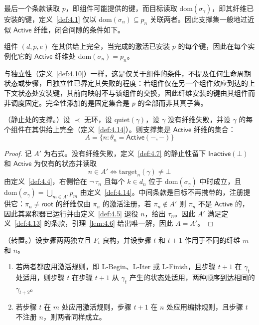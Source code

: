 最后一个条款读取 $p$，即组件可能提供的键，而目标读取 $\mathrm{dom}(\sigma_\gamma)$，即其纤维已安装的键，定义~\ref{def:4.1} 仅以 $\mathrm{dom}(\sigma_n) \subseteq p_n$ 关联两者。因此支撑集一般地过近似 $\mathsf{Active}$ 纤维，闭合间隙的条件如下。

\begin{definition}\label{def:4.16}
组件 $(d, p, e)$ 在其供给上完全，当完成的激活已安装 $p$ 的每个键，因此在每个实例化它的 $\mathsf{Active}$ 纤维处 $\mathrm{dom}(\sigma_n) = p_n$。
\end{definition}

与独立性（定义~\ref{def:4.10}）一样，这是仅关于组件的条件，不提及任何生命周期状态或步骤，且独立性已界定其失败的程度：若组件仅在另一个组件效应到达的上下文状态处安装键，其前向映射不与该组件的交换，因此纤维安装的键由其组件而非调度固定。完全性添加的是固定集合是 $p$ 的全部而非其真子集。

\begin{lemma}\label{lem:4.7}
（静止处的支撑。）设 $\prec$ 无环，设 $\mathrm{quiet}(\gamma)$，设 $\gamma$ 没有纤维失败，并设 $\gamma$ 的每个组件在其供给上完全（定义~\ref{def:4.14}）。则支撑集是 $\mathsf{Active}$ 纤维的集合：
\begin{equation}\label{eq:4.33}
A = \{n: \theta_n = \mathsf{Active}(-, -)\}
\end{equation}
\end{lemma}

\begin{proof}
记 $A'$ 为右式。没有纤维失败，定义~\ref{def:4.7} 的静止性留下 $\mathsf{Inactive}(\bot)$ 和 $\mathsf{Active}$ 为仅有的状态并读取
\[
n \in A' \iff \mathrm{target}_n(\gamma) \neq \bot
\]
由定义~\ref{def:4.4}，右侧恰在 $\lnot\,\tau_n$ 且每个 $k \in d_n$ 位于 $\mathrm{dom}(\sigma_\gamma)$ 中时成立，且 $\mathrm{dom}(\sigma_\gamma) = \bigcup_{m \in A'} p_m$ 由定义~\ref{def:4.14}。中间条款是目标不再携带的，注册提供它：$\pi_n \neq \mathsf{root}$ 的纤维仅由 $\pi_n$ 的激活注册，若 $\pi_n \notin A'$ 则 $\pi_n$ 不是 $\mathsf{Active}$ 的，因此其累积器已运行并由定义~\ref{def:4.5} 退役 $n$，给出 $\tau_n$。因此 $A'$ 满足定义~\ref{def:4.13} 的条款，引理~\ref{lem:4.6} 给出唯一解，因此 $A = A'$。
\end{proof}

\begin{lemma}\label{lem:4.8}
（转置。）设步骤两两独立且 $F_t$ 良构，并设步骤 $t$ 和 $t + 1$ 作用于不同的纤维 $m$ 和 $n$。
\begin{enumerate}
\item 若两者都应用激活规则，即 L-Begin、L-Iter 或 L-Finish，且步骤 $t + 1$ 在 $\gamma_t$ 处适用，则步骤 $t$ 在步骤 $t + 1$ 从 $\gamma_t$ 产生的状态处适用，两种顺序到达相同的 $\gamma_{t+2}$。
\item 若步骤 $t$ 在 $m$ 处应用激活规则，步骤 $t + 1$ 在 $n$ 处应用编排规则，且步骤 $t$ 不注册 $n$，则两者同样成立。
\end{enumerate}
\end{lemma}

